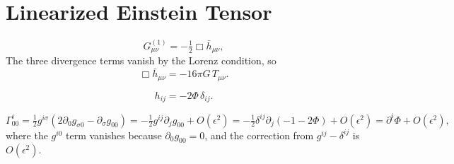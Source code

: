 \section{Linearized Einstein Tensor}

\[
G_{\mu\nu}^{(1)}=-\tfrac{1}{2}\Box\bar h_{\mu\nu},
\]
The three divergence terms vanish by the Lorenz condition, so
\[
\Box\bar h_{\mu\nu}=-16\pi G\,T_{\mu\nu}.
\]

\[
h_{ij} = -2\Phi\,\delta_{ij}.
\]

\[
\Gamma^i_{00}=\tfrac{1}{2}g^{i\sigma}(2\partial_0 g_{\sigma 0}-\partial_\sigma g_{00})
=-\tfrac{1}{2}g^{ij}\partial_j g_{00}+O(\epsilon^2)
=-\tfrac{1}{2}\delta^{ij}\partial_j(-1-2\Phi)+O(\epsilon^2)
=\partial^i\Phi+O(\epsilon^2),
\]
where the \(g^{i0}\) term vanishes because \(\partial_0 g_{00}=0\), and the correction from \(g^{ij}-\delta^{ij}\) is \(O(\epsilon^2)\).
